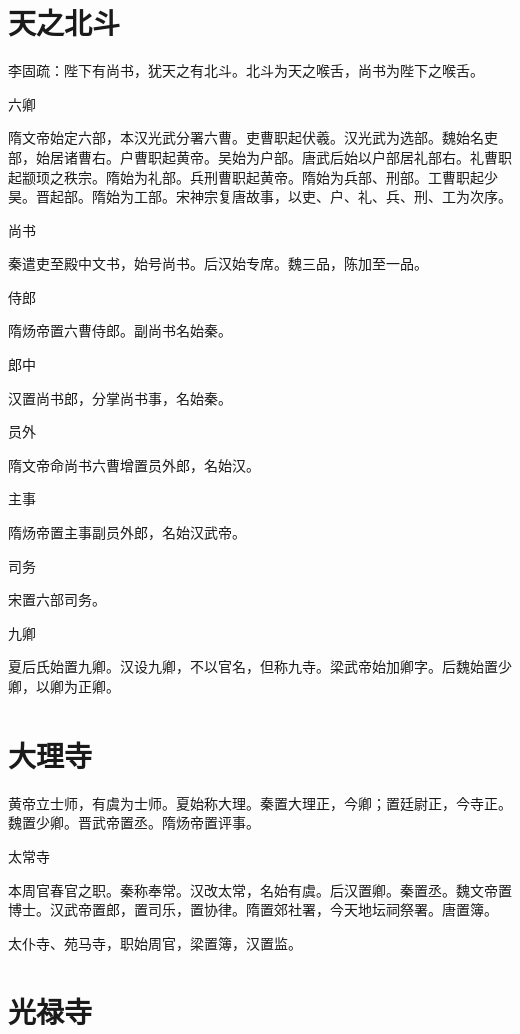 \documentclass[a4paper,12pt,UTF8,twoside]{ctexbook}
\begin{document}
    \section{天之北斗}
    
    李固疏：陛下有尚书，犹天之有北斗。北斗为天之喉舌，尚书为陛下之喉舌。
    
    六卿
    
    隋文帝始定六部，本汉光武分署六曹。吏曹职起伏羲。汉光武为选部。魏始名吏部，始居诸曹右。户曹职起黄帝。吴始为户部。唐武后始以户部居礼部右。礼曹职起颛顼之秩宗。隋始为礼部。兵刑曹职起黄帝。隋始为兵部、刑部。工曹职起少昊。晋起部。隋始为工部。宋神宗复唐故事，以吏、户、礼、兵、刑、工为次序。
    
    尚书
    
    秦遣吏至殿中文书，始号尚书。后汉始专席。魏三品，陈加至一品。
    
    侍郎
    
    隋炀帝置六曹侍郎。副尚书名始秦。
    
    郎中
    
    汉置尚书郎，分掌尚书事，名始秦。
    
    员外
    
    隋文帝命尚书六曹增置员外郎，名始汉。
    
    主事
    
    隋炀帝置主事副员外郎，名始汉武帝。
    
    司务
    
    宋置六部司务。
    
    九卿
    
    夏后氏始置九卿。汉设九卿，不以官名，但称九寺。梁武帝始加卿字。后魏始置少卿，以卿为正卿。
    
    \section{大理寺}
    
    黄帝立士师，有虞为士师。夏始称大理。秦置大理正，今卿；置廷尉正，今寺正。魏置少卿。晋武帝置丞。隋炀帝置评事。
    
    太常寺
    
    本周官春官之职。秦称奉常。汉改太常，名始有虞。后汉置卿。秦置丞。魏文帝置博士。汉武帝置郎，置司乐，置协律。隋置郊社署，今天地坛祠祭署。唐置簿。
    
    太仆寺、苑马寺，职始周官，梁置簿，汉置监。
    
    \section{光禄寺}
    
\end{document}

